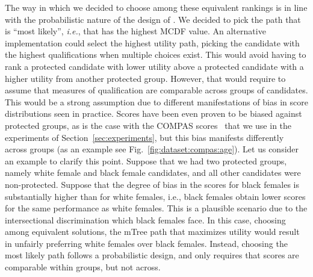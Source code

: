 The way in which we decided to choose among these equivalent rankings is in line with the probabilistic nature of the design of \algoFAIR.
%
We decided to pick the path that is ``most likely'', {\it i.e.}, that has the highest MCDF value.
%
An alternative implementation could select the highest utility path, picking the candidate with the highest qualifications when multiple choices exist.
%
This would avoid having to rank a protected candidate with lower utility above a protected candidate with a higher utility from another protected group.
%
However, that would require to assume that measures of qualification are comparable across groups of candidates.
%
This would be a strong assumption due to different manifestations of bias in score distributions seen in practice.
%
Scores have been even proven to be biased against protected groups, as is the case with the COMPAS scores~\cite{angwin_2016_machine} that we use in the experiments of Section~\ref{sec:experiments}, but this bias manifests differently across groups (as an example see Fig.~\ref{fig:dataset:compas:age}).
%
Let us consider an example to clarify this point.
%
Suppose that we had two protected groups, namely white female and black female candidates, and all other candidates were non-protected.
%
%
Suppose that the degree of bias in the scores for black females is substantially higher than for white females, i.e., black females obtain lower scores for the same performance as white females. This is a plausible scenario due to the intersectional discrimination which black females face.
%
In this case, choosing among equivalent solutions, the mTree path that maximizes utility would result in unfairly preferring white females over black females.
%
Instead, choosing the most likely path follows a probabilistic design, and only requires that scores are comparable within groups, but not across.
